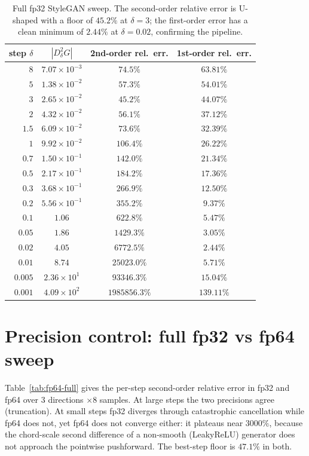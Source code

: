\documentclass[10pt]{article} %
\begin{document}
\begin{table}[h]\centering\small
\begin{tabular}{rccc}
\toprule
step $\delta$ & $|D^2_\delta G|$ & 2nd-order rel.\ err. & 1st-order rel.\ err. \\
\midrule
$8$ & $7.07\times10^{-3}$ & $74.5\%$ & $63.81\%$ \\
$5$ & $1.38\times10^{-2}$ & $57.3\%$ & $54.01\%$ \\
$3$ & $2.65\times10^{-2}$ & $45.2\%$ & $44.07\%$ \\
$2$ & $4.32\times10^{-2}$ & $56.1\%$ & $37.12\%$ \\
$1.5$ & $6.09\times10^{-2}$ & $73.6\%$ & $32.39\%$ \\
$1$ & $9.92\times10^{-2}$ & $106.4\%$ & $26.22\%$ \\
$0.7$ & $1.50\times10^{-1}$ & $142.0\%$ & $21.34\%$ \\
$0.5$ & $2.17\times10^{-1}$ & $184.2\%$ & $17.36\%$ \\
$0.3$ & $3.68\times10^{-1}$ & $266.9\%$ & $12.50\%$ \\
$0.2$ & $5.56\times10^{-1}$ & $355.2\%$ & $9.37\%$ \\
$0.1$ & $1.06$ & $622.8\%$ & $5.47\%$ \\
$0.05$ & $1.86$ & $1429.3\%$ & $3.05\%$ \\
$0.02$ & $4.05$ & $6772.5\%$ & $2.44\%$ \\
$0.01$ & $8.74$ & $25023.0\%$ & $5.71\%$ \\
$0.005$ & $2.36\times10^{1}$ & $93346.3\%$ & $15.04\%$ \\
$0.001$ & $4.09\times10^{2}$ & $1985856.3\%$ & $139.11\%$ \\
\bottomrule
\end{tabular}
\caption{Full fp32 StyleGAN sweep. The second-order relative error is U-shaped with
a floor of $45.2\%$ at $\delta=3$; the first-order error has a clean minimum of
$2.44\%$ at $\delta=0.02$, confirming the pipeline.}
\label{tab:stylegan-full}
\end{table}

\section{Precision control: full fp32 vs fp64 sweep}
\label{app:fp64}
Table~\ref{tab:fp64-full} gives the per-step second-order relative error in fp32
and fp64 over $3$ directions $\times8$ samples. At large steps the two precisions
agree (truncation). At small steps fp32 diverges through catastrophic cancellation
while fp64 does not, yet fp64 does not converge either: it plateaus near $3000\%$,
because the chord-scale second difference of a non-smooth (LeakyReLU) generator does
not approach the pointwise pushforward. The best-step floor is $47.1\%$ in both.
\end{document}
